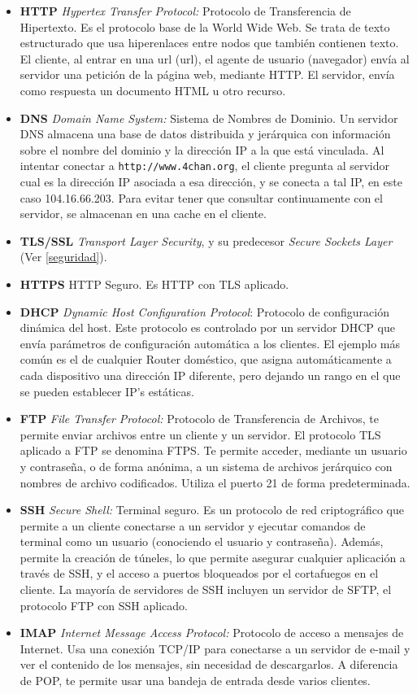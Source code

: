 \documentclass[a4paper, 11pt]{report} %
\newcommand{\acr}[1]{\acrshort{#1} (\acrlong{#1})}
\begin{document}
\begin{itemize}
\item \textbf{HTTP} \textit{Hypertex Transfer Protocol:} Protocolo de Transferencia de Hipertexto. Es el protocolo base de la World Wide Web. Se trata de texto estructurado que usa hiperenlaces entre nodos que también contienen texto. El cliente, al entrar en una \acr{url}, el agente de usuario (navegador) envía al servidor una petición de la página web, mediante HTTP. El servidor, envía como respuesta un documento HTML u otro recurso.
\item \textbf{DNS} \textit{Domain Name System:} Sistema de Nombres de Dominio. Un servidor DNS almacena una base de datos distribuida y jerárquica con información sobre el nombre del dominio y la dirección IP a la que está vinculada. Al intentar conectar a  \texttt{http://www.4chan.org}, el cliente pregunta al servidor cual es la dirección IP asociada a esa dirección, y se conecta a tal IP, en este caso 104.16.66.203. Para evitar tener que consultar continuamente con el servidor, se almacenan en una \gls{cache} en el cliente.
\item \textbf{TLS/SSL} \textit{Transport Layer Security}, y su predecesor \textit{Secure Sockets Layer} (Ver \ref{seguridad}).
\item \textbf{HTTPS} HTTP Seguro. Es HTTP con TLS aplicado.
\item \textbf{DHCP} \textit{Dynamic Host Configuration Protocol}: Protocolo de configuración dinámica del host. Este protocolo es controlado por un servidor DHCP que envía parámetros de configuración automática a los clientes. El ejemplo más común es el de cualquier Router doméstico, que asigna automáticamente a cada dispositivo una dirección IP diferente, pero dejando un rango en el que se pueden establecer IP's estáticas.
\item \textbf{FTP} \textit{File Transfer Protocol:} Protocolo de Transferencia de Archivos, te permite enviar archivos entre un cliente y un servidor. El protocolo TLS aplicado a FTP se denomina FTPS. Te permite acceder, mediante un usuario y contraseña, o de forma anónima, a un sistema de archivos jerárquico con nombres de archivo codificados. Utiliza el puerto 21 de forma predeterminada.
\item \textbf{SSH} \textit{Secure Shell:} Terminal seguro. Es un protocolo de red criptográfico que permite a un cliente conectarse a un servidor y ejecutar comandos de terminal como un usuario (conociendo el usuario y contraseña). Además, permite la creación de túneles, lo que permite asegurar cualquier aplicación a través de SSH, y el acceso a puertos bloqueados por el cortafuegos en el cliente. La mayoría de servidores de SSH incluyen un servidor de SFTP, el protocolo FTP con SSH aplicado.
\item \textbf{IMAP} \textit{Internet Message Access Protocol:} Protocolo de acceso a mensajes de Internet. Usa una conexión TCP/IP para conectarse a un servidor de e-mail y ver el contenido de los mensajes, sin necesidad de descargarlos. A diferencia de POP, te permite usar una bandeja de entrada desde varios clientes.
\end{itemize}
\end{document}
